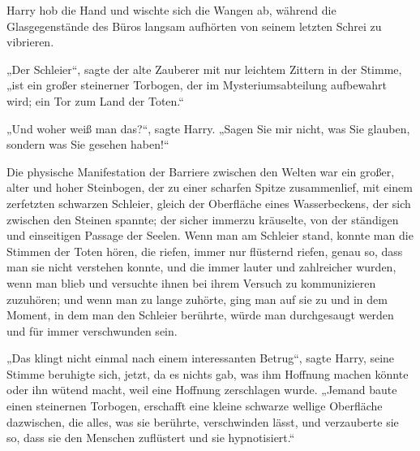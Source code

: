 Harry hob die Hand und wischte sich die Wangen ab, während die Glasgegenstände des Büros langsam aufhörten von seinem letzten Schrei zu vibrieren.

„Der Schleier“, sagte der alte Zauberer mit nur leichtem Zittern in der Stimme, „ist ein großer steinerner Torbogen, der im Mysteriumsabteilung aufbewahrt wird; ein Tor zum Land der Toten.“

„Und woher weiß man das?“, sagte Harry. „Sagen Sie mir nicht, was Sie glauben, sondern was Sie gesehen haben!“

Die physische Manifestation der Barriere zwischen den Welten war ein großer, alter und hoher Steinbogen, der zu einer scharfen Spitze zusammenlief, mit einem zerfetzten schwarzen Schleier, gleich der Oberfläche eines Wasserbeckens, der sich zwischen den Steinen spannte; der sicher immerzu kräuselte, von der ständigen und einseitigen Passage der Seelen. Wenn man am Schleier stand, konnte man die Stimmen der Toten hören, die riefen, immer nur flüsternd riefen, genau so, dass man sie nicht verstehen konnte, und die immer lauter und zahlreicher wurden, wenn man blieb und versuchte ihnen bei ihrem Versuch zu kommunizieren zuzuhören; und wenn man zu lange zuhörte, ging man auf sie zu und in dem Moment, in dem man den Schleier berührte, würde man durchgesaugt werden und für immer verschwunden sein.

„Das klingt nicht einmal nach einem interessanten Betrug“, sagte Harry, seine Stimme beruhigte sich, jetzt, da es nichts gab, was ihm Hoffnung machen könnte oder ihn wütend macht, weil eine Hoffnung zerschlagen wurde. „Jemand baute einen steinernen Torbogen, erschafft eine kleine schwarze wellige Oberfläche dazwischen, die alles, was sie berührte, verschwinden lässt, und verzauberte sie so, dass sie den Menschen zuflüstert und sie hypnotisiert.“

